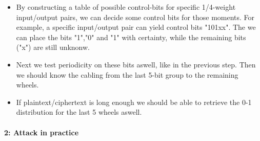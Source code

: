 \documentclass{article}
\begin{document}
\begin{enumerate}
\begin{itemize}
        \item By constructing a table of possible control-bits for specific 1/4-weight input/output pairs,
        we can decide some control bits for those moments. For example, a specific input/output pair can yield 
        control bits "101xx". The we can place the bits "1","0" and "1" with certainty, while the remaining bits ("x") are still unknonw.
        \item Next we test periodicity on these bits aswell, like in the previous step. 
        Then we should know the cabling from the last 5-bit group to the remaining wheels.
        \item If plaintext/ciphertext is long enough we should be able to retrieve the 0-1 distribution 
        for the last 5 wheels aswell.

    \end{itemize}
\end{enumerate}
\paragraph{2: Attack in practice}
\end{document}
